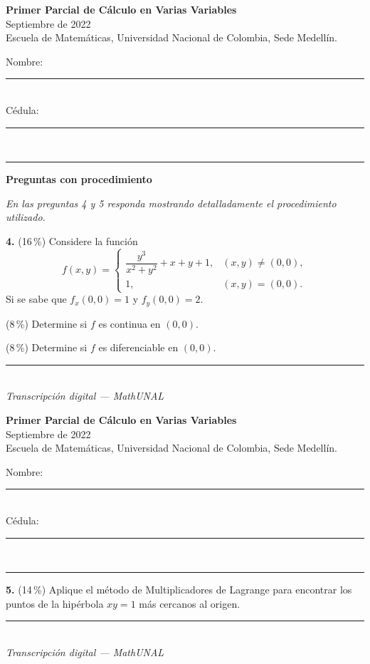 \documentclass[11pt]{article}
\newcommand{\examheader}{%
  \noindent
  \begin{minipage}[t]{0.62\linewidth}
    {\bfseries\large Primer Parcial de C\'alculo en Varias Variables}\\
    {\small Septiembre de 2022}\\
    {\small Escuela de Matem\'aticas, Universidad Nacional de Colombia, Sede Medell\'in.}
  \end{minipage}%
  \hfill
  \begin{minipage}[t]{0.33\linewidth}
    \raggedleft\small
    Nombre: \rule{2.8cm}{0.4pt}\\[4pt]
    C\'edula: \rule{2.8cm}{0.4pt}
  \end{minipage}\\[4pt]
  \rule{\linewidth}{0.6pt}
}
\newcommand{\examfooter}{%
  \vfill
  \rule{\linewidth}{0.4pt}\\[1pt]
  {\scriptsize\textit{Transcripci\'on digital --- MathUNAL}\hfill\textcolor{unalblue}{\textbf{\thepage}}}
}
\begin{document}
\newpage
\examheader
\vspace{2pt}

\textbf{Preguntas con procedimiento}

\textit{En las preguntas 4 y 5 responda mostrando detalladamente el procedimiento utilizado.}

\bigskip
\noindent\textbf{4.} (16\,\%) Considere la funci\'on
$$
f(x,y)=
\begin{cases}
\dfrac{y^3}{x^2+y^2}+x+y+1, & (x,y)\neq (0,0),\\[6pt]
1, & (x,y)=(0,0).
\end{cases}
$$
Si se sabe que $f_x(0,0)=1$ y $f_y(0,0)=2$.

\begin{opciones}
  \item[(a)] (8\,\%) Determine si $f$ es continua en $(0,0)$.
  \item[(b)] (8\,\%) Determine si $f$ es diferenciable en $(0,0)$.
\end{opciones}

\vfill
\examfooter
\newpage
\examheader
\vspace{2pt}

\noindent\textbf{5.} (14\,\%) Aplique el m\'etodo de Multiplicadores de Lagrange para encontrar los puntos de la hip\'erbola $xy=1$ m\'as cercanos al origen.

\vfill
\examfooter
\end{document}
